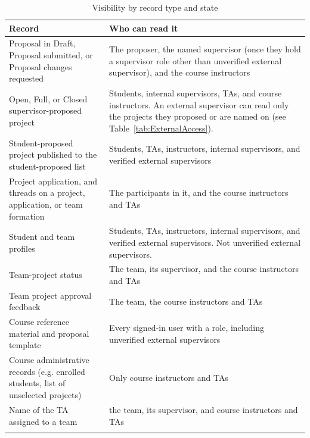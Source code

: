 \documentclass[12pt]{article}
\begin{document}
  \hypertarget{TAB-Visibility}{}
  \begin{longtable}{|p{4.6cm}|p{9.2cm}|}
    \hline
    \textbf{Record} & \textbf{Who can read it} \\ \hline
    Proposal in Draft, Proposal submitted, or Proposal changes requested & The proposer, the named supervisor (once they hold a supervisor role other than unverified external supervisor), and the course instructors \\ \hline
    Open, Full, or Closed supervisor-proposed project & Students, internal supervisors, TAs, and course instructors. An external supervisor can read only the projects they proposed or are named on (see Table~\ref{tab:ExternalAccess}). \\ \hline
    Student-proposed project published to the student-proposed list & Students, TAs, instructors, internal supervisors, and verified external supervisors \\ \hline
    Project application, and threads on a project, application, or team formation & The participants in it, and the course instructors and TAs \\ \hline
    Student and team profiles & Students, TAs, instructors, internal supervisors, and verified external supervisors. Not unverified external supervisors. \\ \hline
    Team-project status & The team, its supervisor, and the course instructors and TAs \\ \hline
    Team project approval feedback & The team, the course instructors and TAs \\ \hline
    Course reference material and proposal template & Every signed-in user with a role, including unverified external supervisors \\ \hline
    Course administrative records (e.g. enrolled students, list of unselected projects) & Only course instructors and TAs \\ \hline
    Name of the TA assigned to a team & the team, its supervisor, and course instructors and TAs \\ \hline
    \caption{Visibility by record type and state} \label{tab:Visibility}
  \end{longtable}
\end{document}
